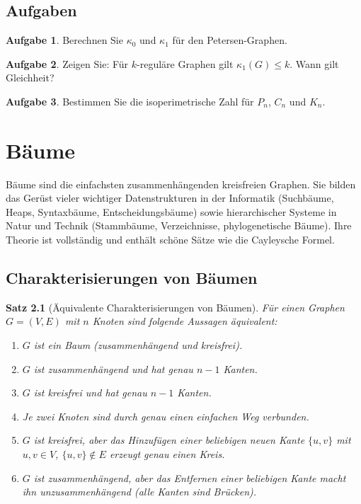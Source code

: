 ﻿\documentclass[a4paper,12pt,openany,oneside]{book}
\theoremstyle{definition}
\newtheorem{aufgabe}{Aufgabe}[chapter]
\theoremstyle{plain}
\newtheorem{satz}{Satz}[chapter]
\theoremstyle{remark}
\begin{document}
\section{Aufgaben}

\begin{aufgabe}
  Berechnen Sie $\kappa_0$ und $\kappa_1$ f\"ur den Petersen-Graphen.
\end{aufgabe}

\begin{aufgabe}
  Zeigen Sie: F\"ur $k$-regul\"are Graphen gilt $\kappa_1(G) \leq k$.
  Wann gilt Gleichheit?
\end{aufgabe}

\begin{aufgabe}
  Bestimmen Sie die isoperimetrische Zahl f\"ur $P_n$, $C_n$ und $K_n$.
\end{aufgabe}

\chapter{B\"aume}

B\"aume sind die einfachsten zusammenh\"angenden kreisfreien Graphen.
Sie bilden das Ger\"ust vieler wichtiger Datenstrukturen in der Informatik
(Suchb\"aume, Heaps, Syntaxb\"aume, Entscheidungsb\"aume) sowie
hierarchischer Systeme in Natur und Technik (Stammbäume, Verzeichnisse,
phylogenetische B\"aume). Ihre Theorie ist vollst\"andig und enth\"alt
sch\"one S\"atze wie die Cayleysche Formel.

\section{Charakterisierungen von B\"aumen}

\begin{satz}[\"Aquivalente Charakterisierungen von B\"aumen]
  \label{satz:baum-char}
  F\"ur einen Graphen $G = (V,E)$ mit $n$ Knoten sind folgende Aussagen
  \"aquivalent:
  \begin{enumerate}
    \item $G$ ist ein Baum (zusammenh\"angend und kreisfrei).
    \item $G$ ist zusammenh\"angend und hat genau $n-1$ Kanten.
    \item $G$ ist kreisfrei und hat genau $n-1$ Kanten.
    \item Je zwei Knoten sind durch genau einen einfachen Weg verbunden.
    \item $G$ ist kreisfrei, aber das Hinzuf\"ugen einer beliebigen neuen
          Kante $\{u,v\}$ mit $u,v \in V$, $\{u,v\} \notin E$ erzeugt
          genau einen Kreis.
    \item $G$ ist zusammenh\"angend, aber das Entfernen einer beliebigen
          Kante macht ihn unzusammenh\"angend (alle Kanten sind Br\"ucken).
  \end{enumerate}
\end{satz}
\end{document}
